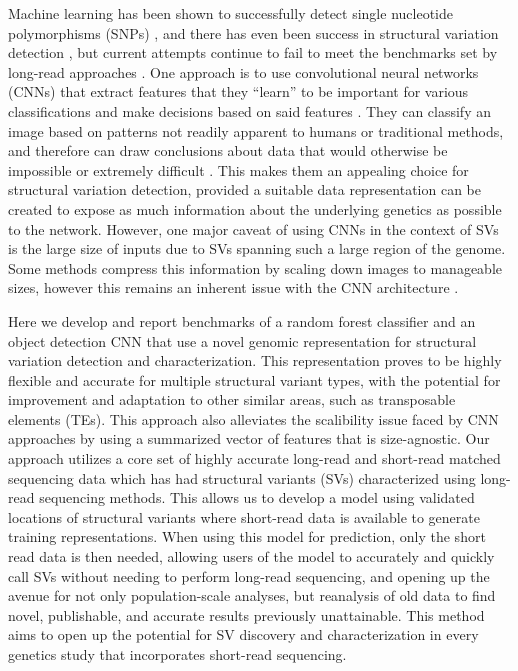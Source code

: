 Machine learning has been shown to successfully detect single nucleotide polymorphisms (SNPs) \cite{poplinUniversalSNPSmallindel2018}, and there has even been success in structural variation detection \cite{popicCueDeeplearningFramework2023,hillDeepLearningApproach2019}, but current attempts continue to fail to meet the benchmarks set by long-read approaches \cite{mahmoudStructuralVariantCalling2019}. One approach is to use convolutional neural networks (CNNs) that extract features that they “learn” to be important for various classifications and make decisions based on said features \cite{liSurveyConvolutionalNeural2022,lecunBackpropagationAppliedHandwritten1989,lecunGradientbasedLearningApplied1998}. They can classify an image based on patterns not readily apparent to humans or traditional methods, and therefore can draw conclusions about data that would otherwise be impossible or extremely difficult \cite{liSurveyConvolutionalNeural2022,guRecentAdvancesConvolutional2018,flagelUnreasonableEffectivenessConvolutional2019}. This makes them an appealing choice for structural variation detection, provided a suitable data representation can be created to expose as much information about the underlying genetics as possible to the network. However, one major caveat of using CNNs in the context of SVs is the large size of inputs due to SVs spanning such a large region of the genome. Some methods compress this information by scaling down images to manageable sizes, however this remains an inherent issue with the CNN architecture \cite{popicCueDeeplearningFramework2023,10.1093/bioinformatics/btae129}. 

Here we develop and report benchmarks of a random forest classifier and an object detection CNN that use a novel genomic representation for structural variation detection and characterization. This representation proves to be highly flexible and accurate for multiple structural variant types, with the potential for improvement and adaptation to other similar areas, such as transposable elements (TEs). This approach also alleviates the scalibility issue faced by CNN approaches by using a summarized vector of features that is size-agnostic. Our approach utilizes a core set of highly accurate long-read and short-read matched sequencing data which has had structural variants (SVs) characterized using long-read sequencing methods. This allows us to develop a model using validated locations of structural variants where short-read data is available to generate training representations. When using this model for prediction, only the short read data is then needed, allowing users of the model to accurately and quickly call SVs without needing to perform long-read sequencing, and opening up the avenue for not only population-scale analyses, but reanalysis of old data to find novel, publishable, and accurate results previously unattainable. This method aims to open up the potential for SV discovery and characterization in every genetics study that incorporates short-read sequencing.

